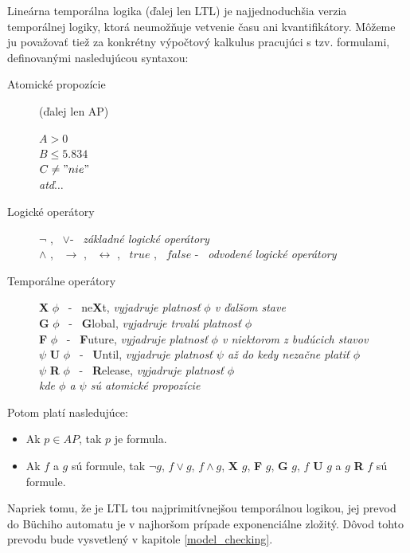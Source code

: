 \documentclass[11pt,final,oneside]{fithesis}
\begin{document}
Line\' arna tempor\' alna logika (\v dalej len LTL) je najjednoduch\v sia verzia tempor\' alnej logiky, ktor\' a neumo\v z\v nuje vetvenie \v casu 
ani kvantifik\' atory.
M\^ o\v zeme ju pova\v zova\v t tie\v z za konkr\' etny v\' ypo\v ctov\' y kalkulus pracuj\' uci s tzv. formulami, definovan\' ymi nasleduj\' ucou syntaxou:
\begin{description}
\item[Atomick\' e propoz\' icie] (\v dalej len AP) \hfill
\begin{center}
$A > 0$ \\
$B \leq 5.834$ \\
$C \neq "nie"$ \\
{\it at\v d$\dots{}$}
\end{center}
\item[Logick\' e oper\' atory] \hfill
\begin{center}	%
$\neg$ , \ $\vee$\hfil\hfil\hfil\hfil\hfil - \ {\it z\' akladn\' e logick\' e oper\' atory}\\
$\wedge$ , \ $\rightarrow$ , \ $\leftrightarrow$ , \ $true$ , \ $false$ \hfil - \ {\it odvoden\' e logick\' e oper\' atory}
\end{center}
\item[Tempor\' alne oper\' atory] \hfill
\begin{center}
{\bf X} $\phi$ \ - \ ne{\bf X}t, {\it vyjadruje platnos\v t $\phi$ v \v dal\v som stave}\\
{\bf G} $\phi$ \ - \ {\bf G}lobal, {\it vyjadruje trval\' u platnos\v t $\phi$ }\\
{\bf F} $\phi$ \ - \ {\bf F}uture, {\it vyjadruje platnos\v t $\phi$ v niektorom z bud\' ucich stavov }\\
$\psi$ {\bf U} $\phi$ \ - \ {\bf U}ntil, {\it vyjadruje platnos\v t $\psi$ a\v z do kedy neza\v cne plati\v t $\phi$}\\
$\psi$ {\bf R} $\phi$ \ - \ {\bf R}elease, {\it vyjadruje platnos\v t $\phi$}\\
{\it kde $\phi$ a $\psi$ s\' u atomick\' e propoz\' icie}
\end{center}
\end{description}
Potom plat\'i nasleduj\'uce:
\begin{itemize}
\item Ak $p \in AP$, tak $p$ je formula.
\item Ak $f$ a $g$ s\'u formule, tak $\neg g$, $f \lor g$, $f \wedge g$, {\bf X} $g$, {\bf F} $g$, {\bf G} $g$, $f$ {\bf U} $g$ a $g$ {\bf R} $f$ s\'u formule.
\end{itemize}
Napriek tomu, \v ze je LTL tou najprimit\' ivnej\v sou tempor\'alnou logikou, jej prevod do B\"uchiho automatu je v najhor\v som pr\' ipade 
exponenci\' alne zlo\v zit\' y. D\^ ovod tohto prevodu bude vysvetlen\' y v kapitole \ref{model_checking}.
\end{document}

